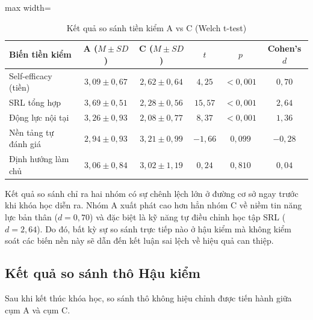 \begin{table}[H]
\centering
\caption{Kết quả so sánh tiền kiểm A vs C (Welch t-test)}
\label{tab:Welch_tien_kiem}
\begin{adjustbox}{max width=\textwidth}
\begin{tabular}{lccccc}
\toprule
\textbf{Biến tiền kiểm} & \textbf{A ($M \pm SD$)} & \textbf{C ($M \pm SD$)} & \textbf{$t$} & \textbf{$p$} & \textbf{Cohen's $d$} \\
\midrule
Self-efficacy (tiền) & $3,09 \pm 0,67$ & $2,62 \pm 0,64$ & $4,25$ & $< 0,001$ & \textbf{$0,70$} \\
SRL tổng hợp & $3,69 \pm 0,51$ & $2,28 \pm 0,56$ & $15,57$ & $< 0,001$ & \textbf{$2,64$} \\
Động lực nội tại & $3,26 \pm 0,93$ & $2,08 \pm 0,77$ & $8,37$ & $< 0,001$ & $1,36$ \\
Nền tảng tự đánh giá & $2,94 \pm 0,93$ & $3,21 \pm 0,99$ & $-1,66$ & $0,099$ & $-0,28$ \\
Định hướng làm chủ & $3,06 \pm 0,84$ & $3,02 \pm 1,19$ & $0,24$ & $0,810$ & $0,04$ \\
\bottomrule
\end{tabular}
\end{adjustbox}
\end{table}

Kết quả so sánh chỉ ra hai nhóm có sự chênh lệch lớn ở đường cơ sở ngay trước khi khóa học diễn ra. Nhóm A xuất phát cao hơn hẳn nhóm C về niềm tin năng lực bản thân ($d = 0,70$) và đặc biệt là kỹ năng tự điều chỉnh học tập SRL ($d = 2,64$). Do đó, bất kỳ sự so sánh trực tiếp nào ở hậu kiểm mà không kiểm soát các biến nền này sẽ dẫn đến kết luận sai lệch về hiệu quả can thiệp.

\subsection{Kết quả so sánh thô Hậu kiểm}

Sau khi kết thúc khóa học, so sánh thô không hiệu chỉnh được tiến hành giữa cụm A và cụm C.

